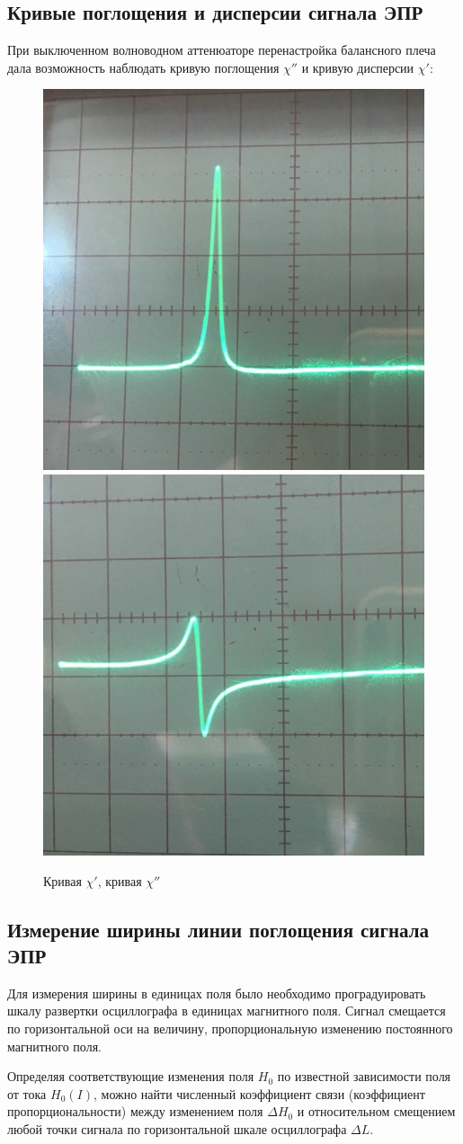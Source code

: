 \documentclass[a4paper,14pt]{extarticle}
\begin{document}
\subsection{Кривые поглощения и дисперсии сигнала ЭПР}
При выключенном волноводном аттенюаторе перенастройка балансного плеча дала возможность наблюдать кривую поглощения $\chi''$ и кривую дисперсии $\chi'$:

\begin{figure}[h!]
    \centering
    \includegraphics[width=0.49\linewidth]{photo/absorption_curve.jpg}
    \includegraphics[width=0.49\linewidth]{photo/dispersion_curve.jpg}
    \caption{Кривая $\chi'$, кривая $\chi''$}
    \label{fig:2}
\end{figure}

\subsection{Измерение ширины линии поглощения сигнала ЭПР}

Для измерения ширины в единицах поля было необходимо проградуировать шкалу развертки осциллографа в единицах магнитного поля. Сигнал смещается по горизонтальной оси на величину, пропорциональную изменению постоянного магнитного поля. 

Определяя соответствующие изменения поля $H_0$ по известной зависимости поля от тока $H_0(I)$, можно найти численный коэффициент связи (коэффициент пропорциональности) между изменением поля $\Delta H_0$ и относительном смещением любой точки сигнала по горизонтальной шкале осциллографа $\Delta L$.
\end{document}
